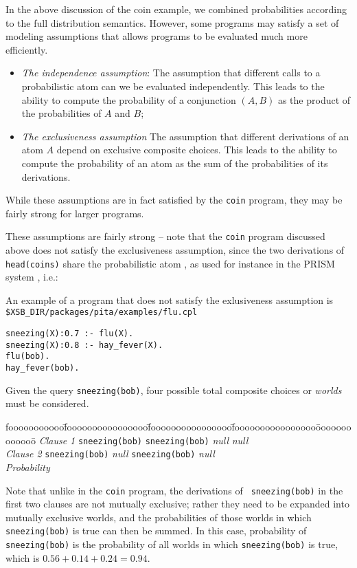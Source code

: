 In the above discussion of the coin example, we combined probabilities
according to the full distribution semantics.  However, some programs
may satisfy a set of modeling assumptions that allows programs to be
evaluated much more efficiently.
%
\begin{itemize}
\item {\em The independence assumption}: The assumption that different
  calls to a probabilistic atom can we be evaluated independently.
  This leads to the ability to compute the probability of a
  conjunction $(A,B)$ as the product of the probabilities of $A$ and
  $B$;
\item {\em The exclusiveness assumption} The assumption that different
  derivations of an atom $A$ depend on exclusive composite choices.
  This leads to the ability to compute the probability of an atom as
  the sum of the probabilities of its derivations.
\end{itemize}
%
While these assumptions are in fact satisfied by the {\tt coin}
program, they may be fairly strong for larger programs.

These assumptions are fairly strong -- note that the {\tt coin}
program discussed above does not satisfy the exclusiveness assumption,
since the two derivations of {\tt head(coins)} share the probabilistic
atom , as used for instance in the PRISM system
\cite{DBLP:conf/ijcai/SatoK97}, i.e.:

\begin{example} \rm 
An example of a program that does not satisfy the exlusiveness
assumption is {\tt \$XSB\_DIR/packages/pita/examples/flu.cpl} 

\begin{verbatim} 
sneezing(X):0.7 :- flu(X).  
sneezing(X):0.8 :- hay_fever(X).  
flu(bob).
hay_fever(bob).
\end{verbatim}

Given the query {\tt sneezing(bob)}, four possible total composite choices or {\em worlds} must
be considered.

\begin{tabbing}
fooooooooooo\=foooooooooooooooo\=foooooooooooooooo\=foooooooooooooooo\=ooooooooooooo\=\kill
{\em Clause 1}    \> {\tt sneezing(bob)} \> {\tt sneezing(bob)} \> {\em null}          \> {\em null} \\
{\em Clause 2}    \> {\tt sneezing(bob)} \> {\em null}          \> {\tt sneezing(bob)} \> {\em null} \\
{\em Probability}                                    
\end{tabbing}
\noindent
Note that unlike in the {\tt coin} program, the derivations of {\tt
  sneezing(bob)} in the first two clauses are not mutually exclusive;
rather they need to be expanded into mutually exclusive worlds, and
the probabilities of those worlds in which {\tt sneezing(bob)} is true
can then be summed.  In this case, probability of {\tt sneezing(bob)}
is the probability of all worlds in which {\tt sneezing(bob)} is true,
which is $0.56+0.14+0.24=0.94$.
\end{example}

